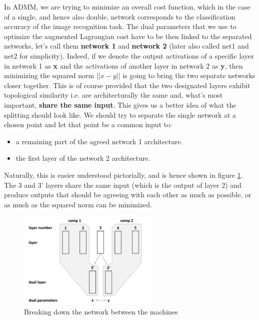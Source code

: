 \documentclass[a4paper, 12pt]{article}
\numberwithin{equation}{section}
\begin{document}
	In ADMM, we are trying to minimize an overall cost function, which in the case of a single, and hence also double, network corresponds to the classification accuracy of the image recognition task. The dual parameters that we use to optimize the augmented Lagrangian cost have to be then linked to the separated networks, let's call them \textbf{network 1} and \textbf{network 2} (later also called net1 and net2 for simplicity). Indeed, if we denote the output activations of a specific layer in network 1 as \textbf{x} and the activations of another layer in network 2 as \textbf{y}, then minimizing the squared norm $||x-y||$ is going to bring the two separate networks closer together. This is of course provided that the two designated layers exhibit topological similarity i.e. are architecturally the same and, what's most important, \textbf{share the same input}. This gives us a better idea of what the splitting should look like. We should try to separate the single network at a chosen point and let that point be a common input to:
	\begin{itemize}
		\item a remaining part of the agreed network 1 architecture.
		\item the first layer of the network 2 architecture.
	\end{itemize}
	
	Naturally, this is easier understood pictorially, and is hence shown in figure \ref{fig:dual-training}. The 3 and 3' layers share the same input (which is the output of layer 2) and produce outputs that should be agreeing with each other as much as possible, or as much as the squared norm can be minimized.
	
	\begin{figure}[!h]
		\centering
		\includegraphics[page=1,width=0.60\textwidth]{dual-training.pdf}
		\caption{\label{fig:dual-training}{Breaking down the network between the machines}}
	\end{figure}
	
\end{document}
